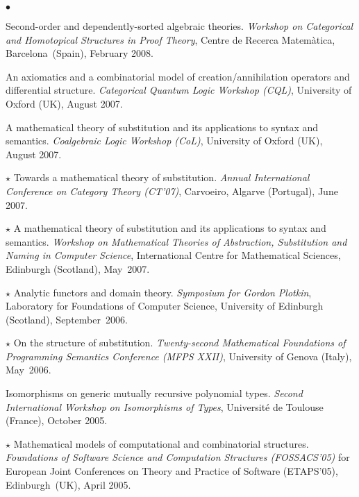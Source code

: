 \documentclass[11pt,twocolumn]{article}
\newenvironment{mybigitemize}
  {\begin{list}{$\bullet$}
  {\setlength{\topsep}{2pt}
   \setlength{\partopsep}{2pt}
   \setlength{\itemsep}{2.5pt}
   \setlength{\parsep}{2.5pt}
   \setlength{\leftmargin}{1em}
   \setlength{\labelwidth}{.5em}}}
  {\end{list}}
\begin{document}
\begin{mybigitemize}
\item
  Second-order and dependently-sorted algebraic theories.  \emph{Workshop on
    Categorical and Homotopical Structures in Proof Theory}, Centre de Recerca
  Matem\`atica, %
  Barcelona~(Spain), February 2008.

\item
  An axiomatics and a combinatorial model of creation/annihilation operators
  and differential structure.  \emph{Categorical Quantum Logic
    Workshop (CQL)}, %
  University of Oxford (UK), August 2007.

\item
  A mathematical theory of substitution and its applications to syntax and
  semantics.  \emph{Coalgebraic Logic Workshop (CoL)}, %
  University of Oxford (UK), August 2007.

\item[$\star$]
  Towards a mathematical theory of substitution.  \emph{Annual International
    Conference on Category Theory (CT'07)}, Carvoeiro, Algarve (Portugal),
  June 2007.
 
\item[$\star$]
  A mathematical theory of substitution and its applications to syntax and
  semantics.  \emph{Workshop on Mathematical Theories of Abstraction,
    Substitution and Naming in Computer Science}, International Centre for
  Mathematical Sciences, %
  Edinburgh (Scotland), May~2007.
 
\item[$\star$]
  Analytic functors and domain theory.  \emph{Symposium for Gordon Plotkin},
  Laboratory for Foundations of Computer Science, %
  University of Edinburgh (Scotland), September~2006.
 
\item[$\star$]
  On the structure of substitution. \emph{Twenty-second Mathematical
    Foundations of Programming Semantics Conference (MFPS XXII)}, %
  University of Genova (Italy), May~2006.
 
\item
  Isomorphisms on generic mutually recursive polynomial types.  \emph{Second
    International Workshop on Isomorphisms of Types}, Universit\'e de Toulouse
  (France), October 2005.

\item[$\star$]
  Mathematical models of computational and combinatorial structures.  
  \emph{Foundations of Software Science and Computation Structures
  (FOSSACS'05)} for European Joint Conferences on Theory and Practice of
  Software (ETAPS'05), Edinburgh~(UK), April 2005.  


\end{mybigitemize}
\end{document}
